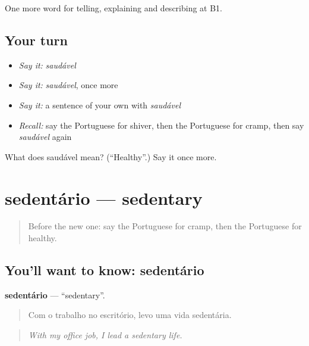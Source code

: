 \begin{grammarlens}[title={What you've built}]
One more word for telling, explaining and describing at B1.
\end{grammarlens}

\subsection*{Your turn}
\begin{itemize}
\raggedright
  \item \emph{Say it:} \emph{saudável}
  \item \emph{Say it:} \emph{saudável}, once more
  \item \emph{Say it:} a sentence of your own with \emph{saudável}
  \item \emph{Recall:} say the Portuguese for shiver, then the Portuguese for cramp, then say \emph{saudável} again
\end{itemize}

\begin{tcolorbox}[breakable,colback=teal!4,colframe=teal!35!black,title={Before you move on}]
What does saudável mean? (\textquotedblleft{}Healthy\textquotedblright{}.) Say it once more.
\end{tcolorbox}
\section[sedentário]{sedentário — sedentary}

\label{lesson:PT-C490-sedentario}



\begin{quote}
Before the new one: say the Portuguese for cramp, then the Portuguese for healthy.
\end{quote}

\subsection*{You'll want to know: sedentário}
\textbf{sedentário} — \textquotedblleft{}sedentary\textquotedblright{}.

\begin{quote}
Com o trabalho no escritório, levo uma vida sedentária.
\end{quote}

\begin{quote}
\emph{With my office job, I lead a sedentary life.}
\end{quote}

